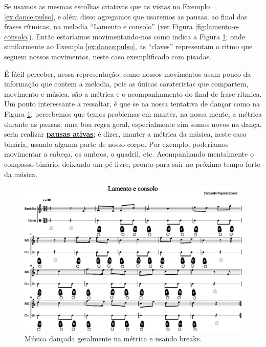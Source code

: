 \begin{example}
Se usamos as mesmas escolhas criativas que as vistas no Exemplo \ref{ex:dance:pulso},
e além disso agregamos que usaremos as pausas, ao final das frases rítmicas,
 na melodia ``Lamento e consolo'' (ver Figura \ref{fig:lamento-e-consolo}). 
Então estaríamos movimentando-nos como indica a Figura \ref{fig:lamentoconsolopulsobreak1};
onde similarmente ao Exemplo \ref{ex:dance:pulso},
as ``claves'' representam o ritmo que seguem nossos movimentos,
neste caso exemplificado com pisadas.

É fácil perceber, nessa representação, 
como nossos movimentos usam pouco da informação que contem a melodia, 
pois as únicas carateristas que compartem, movimento e música, 
são a métrica e o acompanhamento do final de frase rítmica.
Um ponto interessante a ressaltar,
 é que se na nossa tentativa de dançar como na Figura \ref{fig:lamentoconsolopulsobreak1}, 
percebemos que temos problemas em manter, na nossa mente, a métrica durante as pausas; 
uma boa regra geral, especialmente sim somos novos na dança, 
seria realizar \hyperref[ref:pausaativa]{\textbf{pausas ativas}};
é dizer, manter a métrica da música, neste caso binária, usando alguma parte de nosso corpo.
Por exemplo, poderíamos movimentar a cabeça, os ombros, o quadril, etc.
Acompanhando mentalmente o compasso binário,
deixando um pé livre, pronto para sair no próximo tempo forte da música.
\end{example}
\begin{figure}
    \centering
    \includegraphics[width=\textwidth]{chapters/cap-musicalidade-tecnica/lamento-e-consolo-clave-pulso+break-1.eps}
    \caption{Música dançada geralmente na métrica e usando breaks.}
    \label{fig:lamentoconsolopulsobreak1}
\end{figure}
